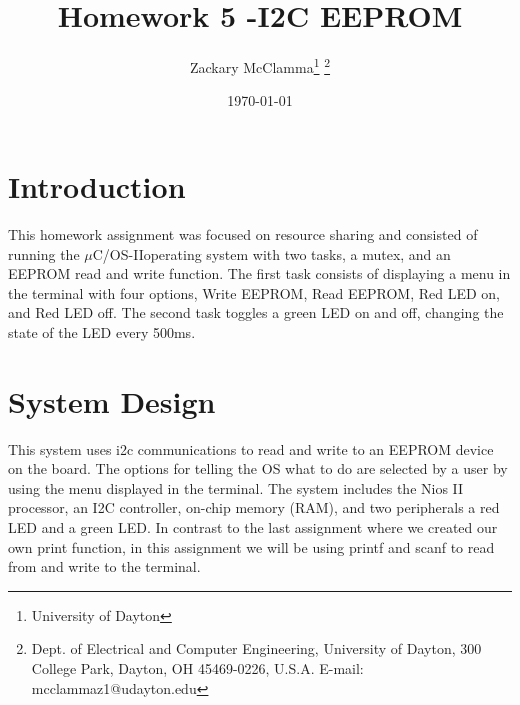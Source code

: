 \documentclass[10pt,a4paper]{article}
\begin{document}
	\title{Homework 5 -I2C EEPROM}
	\makeatletter
	
	\author{Zackary McClamma\thanks{University of Dayton}
		\thanks{Dept. of Electrical and Computer
			Engineering, University of Dayton, 300 College Park, Dayton, OH
			45469-0226, U.S.A. E-mail:
			mcclammaz1@udayton.edu}}
	
	\makeatother
	
	\date{\today}
	
	\maketitle
	\section{Introduction}
	This homework assignment was focused on resource sharing and consisted of running the $\mu$C/OS-II\texttrademark operating system with two tasks, a mutex, and an EEPROM read and write function. The first task consists of displaying a menu in the terminal with four options, Write EEPROM, Read EEPROM, Red LED on, and Red LED off. The second task toggles a green LED on and off, changing the state of the LED every 500ms.
	
	\section{System Design}
 	This system uses i2c communications to read and write to an EEPROM device on the board. The options for telling the OS what to do are selected by a user by using the menu displayed in the terminal. The system includes the Nios II processor, an I2C controller, on-chip memory (RAM), and two peripherals a red LED and a green LED. In contrast to the last assignment where we created our own print function, in this assignment we will be using printf and scanf to read from and write to the terminal. 

	
\end{document}
